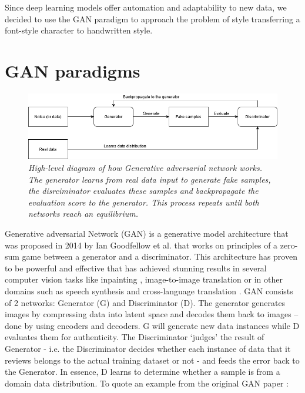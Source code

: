 \documentclass[12pt]{report}
\begin{document}
Since deep learning models offer automation and adaptability to new data, we decided to use the GAN paradigm to approach the problem of style transferring a font-style character to handwritten style.

\section{GAN paradigms}

\begin{figure}[H]
	\centering
	\includegraphics[scale=0.6]{gan-diagram}
	\caption{\textit{High-level diagram of how Generative adversarial network \cite{gan} works. The generator learns from real data input to generate fake samples, the disrciminator evaluates these samples and backpropagate the evaluation score to the generator. This process repeats until both networks reach an equilibrium.}}
	\label{fig:gan-diagram}
\end{figure}

Generative adversarial Network (GAN) is a generative model architecture that was proposed in 2014 by Ian Goodfellow et al.\cite{gan} that works on principles of a zero-sum game between a generator and a discriminator. This architecture has proven to be powerful and effective that has achieved stunning results in several computer vision tasks like inpainting \cite{image-completion}, image-to-image translation \cite{cycle-gan} or in other domains such as speech synthesis \cite{audio-gan} and cross-language translation \cite{nlp}.
GAN consists of 2 networks: Generator (G) and Discriminator (D). The generator generates images by compressing data into latent space and decodes them back to images – done by using encoders and decoders. G will generate new data instances while D evaluates them for authenticity. The Discriminator ‘judges’ the result of Generator - i.e. the Discriminator decides whether each instance of data that it reviews belongs to the actual training dataset or not - and feeds the error back to the Generator. In essence, D learns to determine whether a sample is from a domain data distribution. To quote an example from the original GAN paper \cite{gan}:
\end{document}
